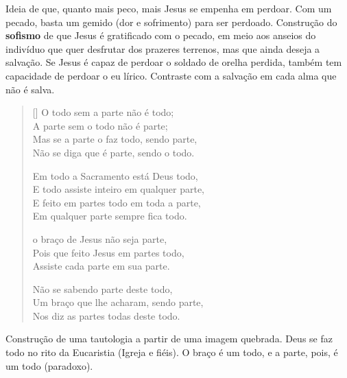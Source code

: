 \documentclass[12pt]{book}
\begin{document}
			\par Ideia de que, quanto mais peco, mais Jesus se empenha em perdoar. Com um pecado, basta um gemido (dor e sofrimento) para ser perdoado. Construção do \textbf{sofismo} de que Jesus é gratificado com o pecado, em meio aos anseios do indivíduo que quer desfrutar dos prazeres terrenos, mas que ainda deseja a salvação. Se Jesus é capaz de perdoar o soldado de orelha perdida, também tem capacidade de perdoar o eu lírico. Contraste com a salvação em cada alma que não é salva.
			\settowidth{\versewidth}{A parte sem o todo não é parte;}
			\begin{verse}[\versewidth]
				O todo sem a parte não é todo; \\
				A parte sem o todo não é parte; \\
				Mas se a parte o faz todo, sendo parte, \\
				Não se diga que é parte, sendo o todo. 
				
				Em todo a Sacramento está Deus todo, \\
				E todo assiste inteiro em qualquer parte, \\
				E feito em partes todo em toda a parte, \\
				Em qualquer parte sempre fica todo. 
				
				o braço de Jesus não seja parte, \\
				Pois que feito Jesus em partes todo, \\
				Assiste cada parte em sua parte.
				
				Não se sabendo parte deste todo, \\
				Um braço que lhe acharam, sendo parte, \\
				Nos diz as partes todas deste todo. 
			\end{verse}
			\par Construção de uma tautologia a partir de uma imagem quebrada. Deus se faz todo no rito da Eucaristia (Igreja e fiéis). O braço é um todo, e a parte, pois, é um todo (paradoxo).
			\settowidth{\versewidth}{Estás e estou do nosso antigo estado!}
\end{document}
